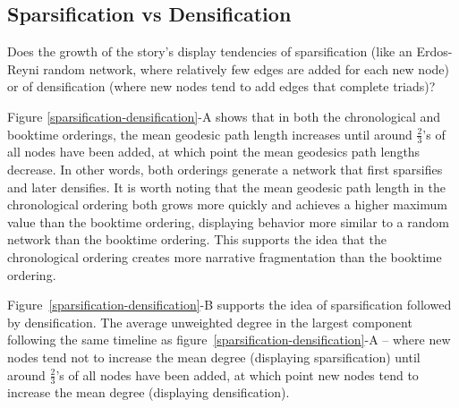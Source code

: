 \subsection{Sparsification vs Densification}

Does the growth of the story's display tendencies of sparsification (like an Erdos-Reyni random network, where relatively few edges are added for each new node) or of densification (where new nodes tend to add edges that complete triads)?

Figure \ref{sparsification-densification}-A shows that in both the chronological and booktime orderings, the mean geodesic path length increases until around $\frac{2}{3}$'s of all nodes have been added, at which point the mean geodesics path lengths decrease. In other words, both orderings generate a network that first sparsifies and later densifies. It is worth noting that the mean geodesic path length in the chronological ordering both grows more quickly and achieves a higher maximum value than the booktime ordering, displaying behavior more similar to a random network than the booktime ordering. This supports the idea that the chronological ordering creates more narrative fragmentation than the booktime ordering.

Figure~\ref{sparsification-densification}-B supports the idea of sparsification followed by densification. The average unweighted degree in the largest component following the same timeline as figure~\ref{sparsification-densification}-A -- where new nodes tend not to increase the mean degree (displaying sparsification) until around $\frac{2}{3}$'s of all nodes have been added, at which point new nodes tend to increase the mean degree (displaying densification).


